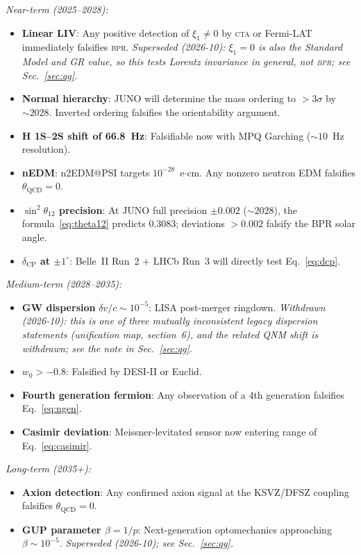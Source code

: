 \documentclass[aps,prd,twocolumn,superscriptaddress,longbibliography,nofootinbib]{revtex4-2}
\newcommand{\bpr}{\textsc{bpr}}
\begin{document}
\textit{Near-term (2025--2028):}
\begin{itemize}
\item \textbf{Linear LIV}: Any positive detection of $\xi_1 \neq 0$ by
  \textsc{cta} or Fermi-LAT immediately falsifies \bpr.
  \textit{Superseded (2026-10): $\xi_1 = 0$ is also the Standard Model
  and GR value, so this tests Lorentz invariance in general, not
  \bpr; see Sec.~\ref{sec:qg}.}
\item \textbf{Normal hierarchy}: JUNO will determine the mass ordering
  to $> 3\sigma$ by $\sim 2028$.  Inverted ordering falsifies the
  orientability argument.
\item \textbf{H 1S--2S shift of 66.8~Hz}: Falsifiable now with
  MPQ Garching ($\sim 10$~Hz resolution).
\item \textbf{nEDM}: n2EDM@PSI targets $10^{-28}$~e$\cdot$cm.  Any
  nonzero neutron EDM falsifies $\theta_{\mathrm{QCD}} = 0$.
\item \textbf{$\sin^2\theta_{12}$ precision}: At JUNO full precision
  $\pm 0.002$ ($\sim 2028$), the formula~\eqref{eq:theta12} predicts
  $0.3083$; deviations $> 0.002$ falsify the BPR solar angle.
\item \textbf{$\delta_{\mathrm{CP}}$ at $\pm 1^\circ$}: Belle~II Run~2
  + LHCb Run~3 will directly test Eq.~\eqref{eq:dcp}.
\end{itemize}

\textit{Medium-term (2028--2035):}
\begin{itemize}
\item \textbf{GW dispersion} $\delta v/c \sim 10^{-5}$: LISA post-merger
  ringdown.  \textit{Withdrawn (2026-10): this is one of three mutually
  inconsistent legacy dispersion statements (unification map,
  section~6), and the related QNM shift is withdrawn; see the note in
  Sec.~\ref{sec:qg}.}
\item \textbf{$w_0 > -0.8$}: Falsified by DESI-II or Euclid.
\item \textbf{Fourth generation fermion}: Any observation of a 4th
  generation falsifies Eq.~\eqref{eq:ngen}.
\item \textbf{Casimir deviation}: Meissner-levitated sensor now entering
  range of Eq.~\eqref{eq:casimir}.
\end{itemize}

\textit{Long-term (2035+):}
\begin{itemize}
\item \textbf{Axion detection}: Any confirmed axion signal at the
  KSVZ/DFSZ coupling falsifies $\theta_{\mathrm{QCD}} = 0$.
\item \textbf{GUP parameter $\beta = 1/p$}: Next-generation
  optomechanics approaching $\beta \sim 10^{-5}$.
  \textit{Superseded (2026-10); see Sec.~\ref{sec:qg}.}
\end{itemize}
\end{document}
